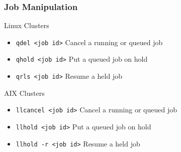 \documentclass[slidestop,mathserif,compress,xcolor=svgnames,table]{beamer}
\newenvironment{bblock}[0]
{
\begin{beamerboxesrounded}[upper=uppercol1,lower=lowercol1,shadow=true]}
{\end{beamerboxesrounded}}
\begin{document}
\begin{frame}
\frametitle{\small Job Manipulation}
\begin{bblock}{Linux Clusters}
\begin{itemize}
\item \texttt{qdel <job id>}\hspace{1cm} {\color{red}Cancel a running or queued job}
\item \texttt{qhold <job id>}\hspace{0.8cm} {\color{red} Put a queued job on hold}
\item \texttt{qrls <job id>}\hspace{1cm} {\color{red} Resume a held job }
\end{itemize}
\end{bblock}
\vspace{1cm}
\begin{bblock}{AIX Clusters}
\begin{itemize}
\item \texttt{llcancel <job id>}\hspace{1cm} {\color{red} Cancel a running or queued job }
\item \texttt{llhold <job id>}\hspace{1.4cm} {\color{red} Put a queued job on hold }
\item \texttt{llhold -r <job id>}\hspace{0.8cm} {\color{red} Resume a held job }
\end{itemize}
\end{bblock}
\end{frame}
\end{document}
